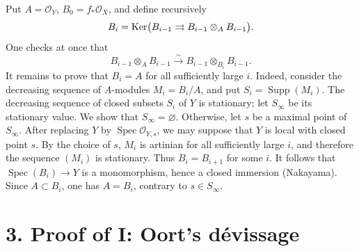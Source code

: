 Put $A=\mathcal O_Y$, $B_0=f_*\mathcal O_X$, and define recursively
\[
  B_i=\operatorname{Ker}\bigl(
    B_{i-1}\rightrightarrows B_{i-1}\otimes_A B_{i-1}
  \bigr).
\]
One checks at once that
\[
  B_{i-1}\otimes_A B_{i-1}
  \xrightarrow{\sim}
  B_{i-1}\otimes_{B_i}B_{i-1}.
\]
It remains to prove that $B_i=A$ for all sufficiently large $i$. Indeed,
  consider the decreasing sequence of $A$-modules $M_i=B_i/A$, and put
$S_i=\operatorname{Supp}(M_i)$. The decreasing sequence of closed subsets $S_i$ of $Y$
is stationary; let $S_\infty$ be its stationary value. We show that
$S_\infty=\varnothing$. Otherwise, let $s$ be a maximal point of
$S_\infty$. After replacing $Y$ by $\operatorname{Spec}\mathcal O_{Y,s}$, we may suppose
that $Y$ is local with closed point $s$. By the choice of $s$, $M_i$ is
artinian for all sufficiently large $i$, and therefore the sequence $(M_i)$
is stationary. Thus $B_i=B_{i+1}$ for some $i$. It follows that
$\operatorname{Spec}(B_i)\to Y$ is a monomorphism, hence a closed immersion (Nakayama).
Since $A\subset B_i$, one has $A=B_i$, contrary to $s\in S_\infty$.

\section*{3. Proof of I: Oort's d\'evissage}


